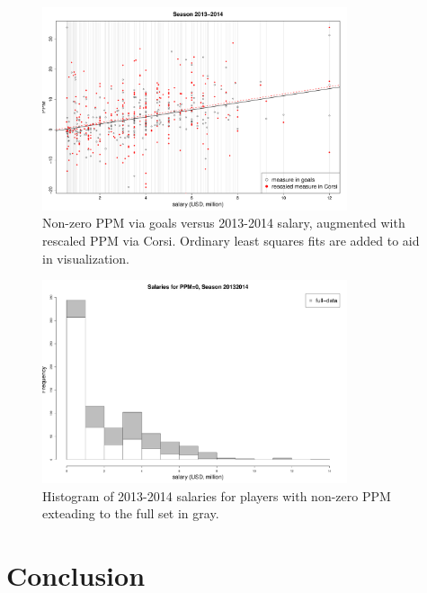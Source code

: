 \begin{figure}[htb!]
    \centering
    \includegraphics[width=0.8\textwidth]{figures/ppmsal-scat.pdf}
    \caption{Non-zero PPM via goals versus 2013-2014 salary, augmented with rescaled PPM via Corsi. Ordinary least squares fits are added to aid in visualization.}\label{fig:ppmsal-scat}
\end{figure}


\begin{figure}[htb!]
	\centering
	\includegraphics[width=0.8\textwidth]{figures/salaryhist.pdf}
	\caption{Histogram of 2013-2014 salaries for players with non-zero PPM exteading to the full set in gray.}\label{fig:salaryhist}
\end{figure}


\section{Conclusion}\label{sec:conclusion}

